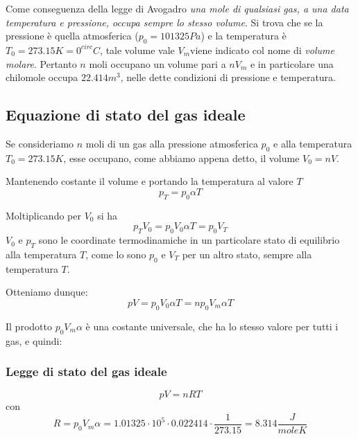 \documentclass[class=book, crop=false, oneside, 12pt]{standalone}
\begin{document}
Come conseguenza della legge di Avogadro \emph{una mole di qualsiasi gas, a una data temperatura e pressione, occupa sempre lo stesso volume}.\newline
Si trova che se la pressione è quella atmosferica (\( p_0 = 101325 Pa\)) e la temperatura è \(T_0 = 273.15 K = 0 ^{circ} C \), tale volume vale \(V_m\)viene indicato col nome di \emph{volume molare}. 
Pertanto \(n\) moli occupano un volume pari a \(n V_m\) e in particolare una chilomole occupa \(22.414 m^3\), nelle dette condizioni di pressione e temperatura. 

\subsection{Equazione di stato del gas ideale}

Se consideriamo \(n\) moli di un gas alla pressione atmosferica \(p_0\) e alla temperatura \(T_0 = 273.15 K\), esse occupano, come abbiamo appena detto, il volume \(V_0 = n V\).

Mantenendo costante il volume e portando la temperatura al valore \(T\)
\begin{equation*}
    p_T = p_0 \alpha T
\end{equation*} 

Moltiplicando per \(V_0\) si ha
\begin{equation*}
    p_T V_0 = p_0 V_0 \alpha T = p_0 V_T
\end{equation*}
\(V_0\) e \(p_T\) sono le coordinate termodinamiche in un particolare stato di equilibrio alla temperatura \(T\), 
come lo sono \(p_0\) e \(V_T\) per un altro stato, sempre alla temperatura \(T\).

Otteniamo dunque:
\begin{equation*}
    pV = p_0 V_0 \alpha T = n p_0 V_m \alpha T
\end{equation*}

Il prodotto \(p_0 V_m \alpha\) è una costante universale, che ha lo stesso valore per tutti i gas, e quindi: 

\subsubsection*{Legge di stato del gas ideale}

\begin{equation} \label{eq_stato_gas_ideale}
    p V = n R T
\end{equation}
con
\begin{equation*}
    R = p_0 V_m \alpha = 1.01325 \cdot 10^5 \cdot 0.022414 \cdot \frac{1}{273.15} = 8.314 \frac{J}{mole K}
\end{equation*}
\end{document}
